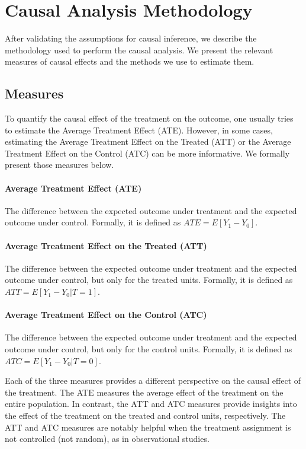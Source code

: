 \documentclass{article}
\begin{document}
\section{Causal Analysis Methodology}

After validating the assumptions for causal inference, we describe the methodology used to perform the causal analysis. We present the relevant measures of causal effects and the methods we use to estimate them.

\subsection{Measures}

To quantify the causal effect of the treatment on the outcome, one usually tries to estimate the Average Treatment Effect (ATE). However, in some cases, estimating the Average Treatment Effect on the Treated (ATT) or the Average Treatment Effect on the Control (ATC) can be more informative. We formally present those measures below.

\paragraph{Average Treatment Effect (ATE)} The difference between the expected outcome under treatment and the expected outcome under control. Formally, it is defined as $ATE = E[Y_1 - Y_0]$.

\paragraph{Average Treatment Effect on the Treated (ATT)} The difference between the expected outcome under treatment and the expected outcome under control, but only for the treated units. Formally, it is defined as $ATT = E[Y_1 - Y_0 | T = 1]$. 

\paragraph{Average Treatment Effect on the Control (ATC)} The difference between the expected outcome under treatment and the expected outcome under control, but only for the control units. Formally, it is defined as $ATC = E[Y_1 - Y_0 | T = 0]$. 

Each of the three measures provides a different perspective on the causal effect of the treatment. The ATE measures the average effect of the treatment on the entire population. In contrast, the ATT and ATC measures provide insights into the effect of the treatment on the treated and control units, respectively. The ATT and ATC measures are notably helpful when the treatment assignment is not controlled (not random), as in observational studies.
\end{document}
